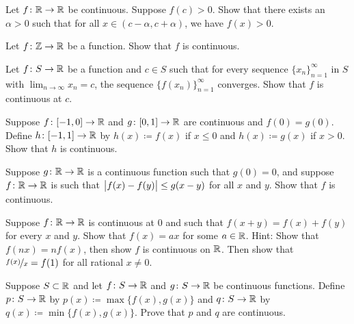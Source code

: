 \begin{exercise} \label{exercise:positivecontneigh}
Let $f \colon {\mathbb{R}} \to {\mathbb{R}}$ be continuous.  Suppose $f(c) > 0$.  Show that
there exists an $\alpha > 0$ such that for all $x \in (c-\alpha,c+\alpha)$,
we have $f(x) > 0$.
\end{exercise}

\begin{exercise}
Let $f \colon {\mathbb{Z}} \to {\mathbb{R}}$ be a function.  Show that $f$ is continuous.
\end{exercise}

\begin{exercise} \label{exercise:contseqalt}
Let $f \colon S \to {\mathbb{R}}$ be a function and $c \in S$ such that for every
sequence $\{ x_n \}_{n=1}^\infty$ in $S$ with $\lim_{n\to\infty} x_n = c$, the sequence
$\bigl\{ f(x_n) \bigr\}_{n=1}^\infty$ converges.  Show that $f$ is continuous at $c$.
\end{exercise}

\begin{exercise}
Suppose $f \colon [-1,0] \to {\mathbb{R}}$ and $g \colon [0,1] \to {\mathbb{R}}$ are continuous
and $f(0) = g(0)$.  Define $h \colon [-1,1] \to {\mathbb{R}}$ by 
$h(x) \coloneqq f(x)$ if $x \leq 0$ and $h(x) \coloneqq g(x)$ if $x > 0$.  Show that
$h$ is continuous.
\end{exercise}

\begin{exercise}
Suppose $g \colon {\mathbb{R}} \to {\mathbb{R}}$ is a continuous function such that $g(0) = 0$,
and suppose $f \colon {\mathbb{R}} \to {\mathbb{R}}$ is such that
$\bigl\lvert {f(x)-f(y)} \bigr\rvert \leq g(x-y)$ for all $x$ and $y$.  Show that $f$ is
continuous.
\end{exercise}

\begin{exercise}[Challenging]
Suppose $f \colon {\mathbb{R}} \to {\mathbb{R}}$ is continuous at $0$ and
such that $f(x+y) = f(x) + f(y)$ for every $x$ and $y$.
Show that $f(x) = ax$ for some $a \in {\mathbb{R}}$.
Hint: Show that $f(nx) = nf(x)$, then show $f$ is continuous on ${\mathbb{R}}$.
Then show that $\nicefrac{f(x)}{x} = f(1)$ for all rational $x \neq 0$.
\end{exercise}

\begin{exercise} \label{exercise:minmaxcont}
Suppose $S \subset {\mathbb{R}}$ and
let $f \colon S \to {\mathbb{R}}$ and
$g \colon S \to {\mathbb{R}}$ be continuous functions.
Define $p \colon S \to {\mathbb{R}}$ by
$p(x) \coloneqq \max \bigl\{ f(x) , g(x) \bigr\}$ and
$q \colon S \to {\mathbb{R}}$ by
$q(x) \coloneqq \min \bigl\{ f(x) , g(x) \bigr\}$.  Prove that $p$ and $q$ are
continuous.
\end{exercise}

